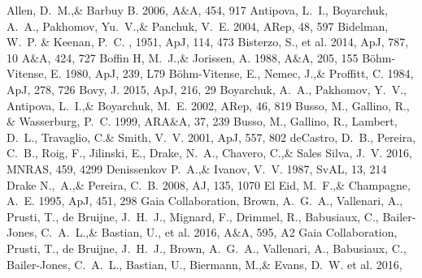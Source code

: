 \documentclass[a4paper,fleqn,usenatbib]{mnras}
\begin{document}
\begin{thebibliography}{99}
Allen, D.~M.,\& Barbuy B. 2006, 
A$\&$A, 454, 917
Antipova, L.~I., Boyarchuk, A.~A., Pakhomov, Yu.~V.,\& Panchuk, V.~E. 2004, 
ARep, 48, 597
Bidelman, W.~P. \& Keenan, P.~C. , 1951, ApJ, 114, 473
Bisterzo, S., et al. 2014, 
ApJ, 787, 10
A$\&$A, 424, 727
Boffin H, M.~J.,\& Jorissen, A. 1988, 
A$\&$A, 205, 155
B\"ohm-Vitense, E. 1980, 
ApJ, 239, L79
B\"ohm-Vitense, E., Nemec, J.,\& Proffitt, C. 1984, 
ApJ, 278, 726
Bovy, J. 2015, 
ApJ, 216, 29
Boyarchuk, A.~A., Pakhomov, Y.~V., Antipova, L.~I.,\& Boyarchuk, M.~E. 2002, 
ARep, 46, 819
Busso, M., Gallino, R., \& Wasserburg, P.~C. 1999, 
ARA$\&$A, 37, 239
Busso, M., Gallino, R., Lambert, D.~L., Travaglio, C.\& Smith, V.~V. 2001, 
ApJ, 557, 802
deCastro, D.~B., Pereira, C.~B., Roig, F., Jilinski, E., Drake, N.~A., Chavero, C.,\& Sales Silva, J.~V. 2016, 
MNRAS, 459, 4299
Denissenkov P.~A.,\& Ivanov, V.~V. 1987, 
SvAL, 13, 214
Drake N.,~A.,\& Pereira, C.~B. 2008, 
AJ, 135, 1070
El Eid, M.~F.,\& Champagne, A.~E. 1995, 
ApJ, 451, 298
Gaia Collaboration, Brown, A.~G.~A., Vallenari, A., Prusti, T., de Bruijne, J.~H.~J., Mignard, F., Drimmel, R., Babusiaux, C., Bailer-Jones, C.~A.~L.,\& Bastian, U., et al. 2016, 
A$\&$A, 595, A2
Gaia Collaboration, Prusti, T., de Bruijne, J.~H.~J., Brown, A.~G.~A., Vallenari, A., Babusiaux, C., Bailer-Jones, C.~A.~L., Bastian, U., Biermann, M.,\& Evans, D.~W. et al. 2016, 

\end{thebibliography}
\end{document}
